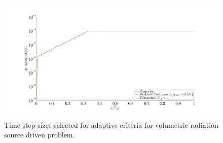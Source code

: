 \begin{figure}[!htp]
\centering
\includegraphics[width=16cm,trim=2in  0.4in 0.5in 0.75in,clip=true]{chapter6_grey_radtran/Dissertation_Data/Source_dt_trace.pdf}
\caption{Time step sizes selected for adaptive criteria for volumetric radiation source driven problem.}
\label{fig:source_trace}
\end{figure}


